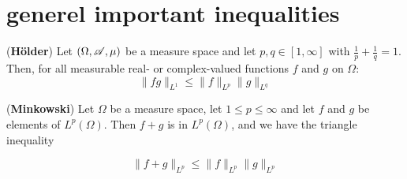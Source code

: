 \section{generel important inequalities}

\begin{theorem}(\textbf{H\"older})
	Let $(\Omega, \mathscr{A}, \mu)$ be a measure space and let $p, q \in [1, \infty]$ with $\frac{1}{p} + \frac{1}{q} = 1$. Then, for all measurable real- or complex-valued functions $f$ and $g$ on $\Omega$:
	\begin{equation*}
		\|fg\|_{L^1} \leq \|f\|_{L^p} \|g\|_{L^q}
	\end{equation*}
\end{theorem}


\begin{theorem}(\textbf{Minkowski})
	 Let $\Omega$ be a measure space, let $1 \leq p \leq \infty$ and let $f$ and $g$ be elements of $L^p(\Omega)$. Then $f + g$ is in $L^p(\Omega)$, and we have the triangle inequality

	\begin{equation*}
	\|f+g\|_{L^p} \leq \|f\|_{L^p} \|g\|_{L^p}
	\end{equation*}
\end{theorem}


